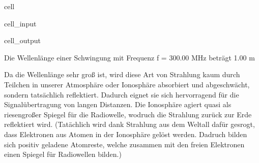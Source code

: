 \documentclass[letterpaper,10pt,english]{jupyterBook}
\begin{document}
\begin{sphinxuseclass}{cell}\begin{sphinxVerbatimInput}

\begin{sphinxuseclass}{cell_input}
\begin{sphinxVerbatim}[commandchars=\\\{\}]
   
   
  
 
\end{sphinxVerbatim}

\end{sphinxuseclass}\end{sphinxVerbatimInput}
\begin{sphinxVerbatimOutput}

\begin{sphinxuseclass}{cell_output}
\begin{sphinxVerbatim}[commandchars=\\\{\}]
Die Wellenlänge einer Schwingung mit Frequenz f = 300.00 MHz beträgt  1.00 m
\end{sphinxVerbatim}

\end{sphinxuseclass}\end{sphinxVerbatimOutput}

\end{sphinxuseclass}
\sphinxAtStartPar
Da die Wellenlänge sehr groß ist, wird diese Art von Strahlung kaum durch Teilchen in unserer Atmosphäre oder Ionosphäre absorbiert und abgeschwächt, sondern tatsächlich reflektiert. Dadurch eignet sie sich hervorragend für die Signalübertragung von langen Distanzen. Die Ionosphäre agiert quasi als riesengroßer Spiegel für die Radiowelle, wodruch die Strahlung zurück zur Erde reflektiert wird. (Tatächlich wird dank Strahlung aus dem Weltall dafür gesrogt, dass Elektronen aus Atomen in der Ionosphäre gelöst werden. Dadruch bilden sich positiv geladene Atomreste, welche zusammen mit den freien Elektronen einen Spiegel für Radiowellen bilden.)
\end{document}
